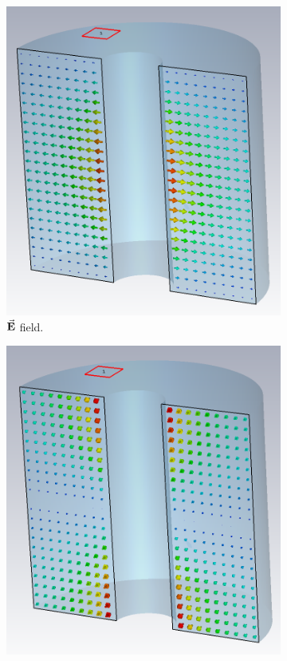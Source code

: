 \documentclass[a4paper,oneside,12pt]{report}
\numberwithin{equation}{chapter}
\begin{document}
\iffalse \begin{figure}[H]
    \centering
    \begin{subfigure}{0.45\textwidth}
        \centering
        \includegraphics[width=\linewidth]{./figures/cst/cavity_E_field_dist.png}
        \caption*{$\vec{\textbf{E}}$ field.}
    \end{subfigure}
    \begin{subfigure}{0.45\textwidth}
        \centering
        \includegraphics[width=\linewidth]{./figures/cst/cavity_B_field_dist.png}

\end{subfigure}
\end{figure}
\end{document}
